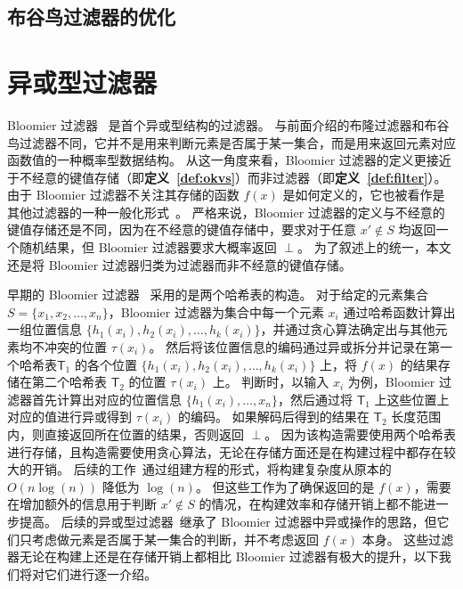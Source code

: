 
\subsection{布谷鸟过滤器的优化}


\section{异或型过滤器}

Bloomier 过滤器~\cite{chazelle2004bloomier,charles2008bloomier} 是首个异或型结构的过滤器。
与前面介绍的布隆过滤器和布谷鸟过滤器不同，它并不是用来判断元素是否属于某一集合，而是用来返回元素对应函数值的一种概率型数据结构。
从这一角度来看，Bloomier 过滤器的定义更接近于不经意的键值存储（即\textbf{定义~\ref{def:okvs}}）而非过滤器（即\textbf{定义~\ref{def:filter}}）。
由于 Bloomier 过滤器不关注其存储的函数 $f(x)$ 是如何定义的，它也被看作是其他过滤器的一种一般化形式~\cite{graf2020xor,li2023chainedfilter}。
严格来说，Bloomier 过滤器的定义与不经意的键值存储还是不同，因为在不经意的键值存储中，要求对于任意 $x'\notin S$ 均返回一个随机结果，但 Bloomier 过滤器要求大概率返回 $\perp$。
为了叙述上的统一，本文还是将 Bloomier 过滤器归类为过滤器而非不经意的键值存储。

早期的 Bloomier 过滤器~\cite{chazelle2004bloomier} 采用的是两个哈希表的构造。
对于给定的元素集合 $S= \{x_1, x_2, \dots, x_n\}$，Bloomier 过滤器为集合中每一个元素 $x_i$ 通过哈希函数计算出一组位置信息 $\{h_1(x_i), h_2(x_i), \dots, h_k(x_i)\}$，并通过贪心算法确定出与其他元素均不冲突的位置 $\tau(x_i)$。
然后将该位置信息的编码通过异或拆分并记录在第一个哈希表$\mathsf{T}_1$ 的各个位置 $\{h_1(x_i), h_2(x_i), \dots, h_k(x_i)\}$ 上，将 $f(x)$ 的结果存储在第二个哈希表 $\mathsf{T}_2$ 的位置 $\tau(x_i)$ 上。
判断时，以输入 $x_i$ 为例，Bloomier 过滤器首先计算出对应的位置信息 $\{h_1(x_i), \dots, x_n\}$，然后通过将 $\mathsf{T}_1$ 上这些位置上对应的值进行异或得到 $\tau(x_i)$ 的编码。
如果解码后得到的结果在 $\mathsf{T}_2$ 长度范围内，则直接返回所在位置的结果，否则返回 $\perp$。
因为该构造需要使用两个哈希表进行存储，且构造需要使用贪心算法，无论在存储方面还是在构建过程中都存在较大的开销。
后续的工作~\cite{charles2008bloomier}通过组建方程的形式，将构建复杂度从原本的 $O(n\log(n))$ 降低为 $\log(n)$。
但这些工作为了确保返回的是 $f(x)$，需要在增加额外的信息用于判断 $x'\notin S$ 的情况，在构建效率和存储开销上都不能进一步提高。
后续的异或型过滤器~\cite{graf2020xor,dillinger2021ribbon,graf2022binary}继承了 Bloomier 过滤器中异或操作的思路，但它们只考虑做元素是否属于某一集合的判断，并不考虑返回 $f(x)$ 本身。
这些过滤器无论在构建上还是在存储开销上都相比 Bloomier 过滤器有极大的提升，以下我们将对它们进行逐一介绍。


